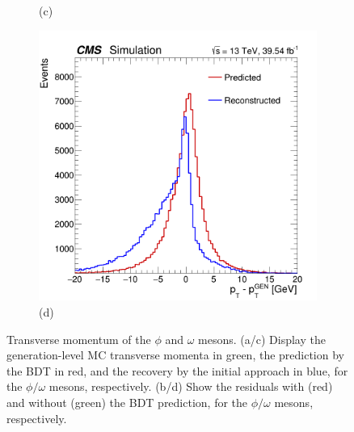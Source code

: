 \begin{figure}[!ht]
\begin{subfigure}[t]{0.50\mylength}
        \vspace*{-0.2cm}
        \caption{\footnotesize (c)}
    \end{subfigure}%
    \begin{subfigure}[t]{0.50\mylength}
        \centering
        \includegraphics[width=0.49\mylength]{resources/plots/Omega_model_pt_residuals.png}
        \vspace*{-0.2cm}
        \caption{\footnotesize (d)}
    \end{subfigure}%
\caption{Transverse momentum of the $\phi$ and $\omega$ mesons. (a/c) Display the generation-level MC transverse momenta in green, the prediction by the BDT in red, and the recovery by the initial approach in blue, for the $\phi/\omega$ mesons, respectively. (b/d) Show the residuals with (red) and without (green) the BDT prediction, for the $\phi/\omega$ mesons, respectively.}
\label{fig:pt_residuals_model_omega_phi}
    \vspace*{-0.0cm}
\end{figure}

